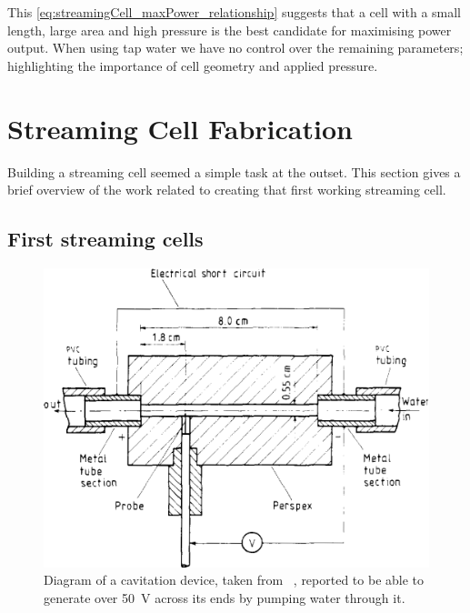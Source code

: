       This \cref{eq:streamingCell_maxPower_relationship} suggests that a cell with a small length, large area and high pressure is the best candidate for maximising power output.
      When using tap water we have no control over the remaining parameters; highlighting the importance of cell geometry and applied pressure.


\section{Streaming Cell Fabrication}
  \label{sect:part1_energyHarvesting_buildingStreamingCells}


  Building a streaming cell seemed a simple task at the outset.
  This section gives a brief overview of the work related to creating that first working streaming cell.


  \subsection{First streaming cells}


    \begin{figure}
      \centering
      \includegraphics{content/pt1/01-PowerHarvesting/graphics/VargaSeymour1986_cell}
      \caption[Diagram of a cavitation device, taken from ~\cite{Varga1986}]{\label{fig:first_cell_diagram}Diagram of a cavitation device, taken from ~\cite{Varga1986}, reported to be able to generate over \SI{50}{\volt} across its ends by pumping water through it.}
    \end{figure}

